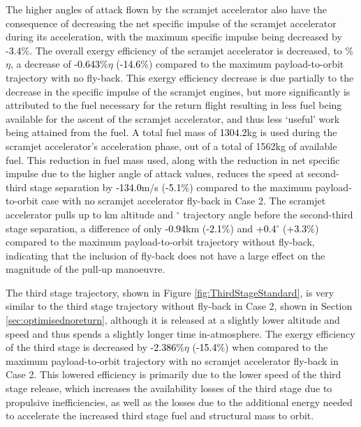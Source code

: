 The higher angles of attack flown by the scramjet accelerator also have the consequence of decreasing the net specific impulse of the scramjet accelerator during its acceleration, with the maximum specific impulse being decreased by -\textcolor{black}{3.4}\%.
The overall exergy efficiency of the scramjet accelerator is decreased, to \secondExergyEffStandard\%$\eta$, a decrease of \textcolor{black}{-0.643}\%$\eta$ (\textcolor{black}{-14.6}\%) compared to the maximum payload-to-orbit trajectory with no fly-back. This exergy efficiency decrease is due partially to the decrease in the specific impulse of the scramjet engines, but more significantly is attributed to the fuel necessary for the return flight resulting in less fuel being available for the ascent of the scramjet accelerator, and thus less `useful' work being attained from the fuel.
A total fuel mass of \textcolor{black}{1304.2}kg is used during the scramjet accelerator's acceleration phase, out of a total of 1562kg of available fuel. This reduction in fuel mass used, along with the reduction in net specific impulse due to the higher angle of attack values, reduces the speed at second-third stage separation by \textcolor{black}{-134.0}m/s (\textcolor{black}{-5.1}\%) compared to the maximum payload-to-orbit case with no scramjet accelerator fly-back in Case 2. The scramjet accelerator pulls up to \secondthirdSeparationAltStandard km altitude and \secondthirdSeparationgammaStandard $^\circ$ trajectory angle before the second-third stage separation, a difference of only \textcolor{black}{-0.94}km (\textcolor{black}{-2.1}\%) and \textcolor{black}{+0.4}$^\circ$ (\textcolor{black}{+3.3}\%) compared to the maximum payload-to-orbit trajectory without fly-back, indicating that the inclusion of fly-back does not have a large effect on the magnitude of the pull-up manoeuvre. 

The third stage trajectory, shown in Figure \ref{fig:ThirdStageStandard}, is very similar to the third stage trajectory without fly-back in Case 2, shown in Section \ref{sec:optimisednoreturn}, although it is released at a slightly lower altitude and speed and thus spends a slightly longer time in-atmosphere. 
The exergy efficiency of the third stage is decreased by \textcolor{black}{-2.386}\%$\eta$ (\textcolor{black}{-15.4}\%) when compared to the maximum payload-to-orbit trajectory with no scramjet accelerator fly-back in Case 2. This lowered efficiency is primarily due to the lower speed of the third stage release, which increases the availability losses of the third stage due to propulsive inefficiencies, as well as the losses due to the additional energy needed to accelerate the increased third stage fuel and structural mass to orbit. 


